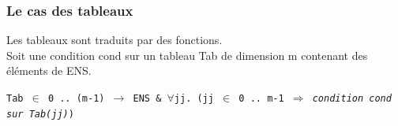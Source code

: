\documentclass[10pt]{beamer}
\begin{document}
\begin{frame}
\frametitle{Le cas des tableaux}
Les tableaux sont traduits par des fonctions.\\
\vspace{0.3cm}
Soit une condition cond sur un tableau Tab de dimension m contenant des éléments
de ENS.\\
\begin{footnotesize}
\texttt{Tab $\in$ 0 .. (m-1) $\rightarrow$ ENS \& $\forall $jj. (jj $\in$ 0
  .. m-1 $\Rightarrow$ \emph{condition cond sur Tab(jj)})}
\end{footnotesize}

\end{frame}
\end{document}
